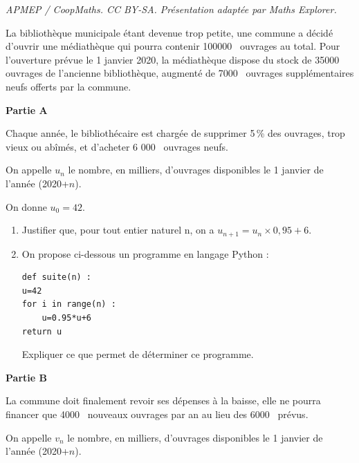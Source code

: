 \documentclass[10pt]{article}
\providecommand{\np}[2][]{{#2~#1}}
\begin{document}
\noindent\textit{APMEP / CoopMaths. CC BY-SA. Présentation adaptée par Maths Explorer.}\par\medskip
\medskip

La bibliothèque municipale étant devenue trop petite, une commune a décidé d'ouvrir une médiathèque qui pourra contenir \np{100000} ouvrages au total. Pour l'ouverture prévue le 1 janvier 2020, la médiathèque dispose du stock de \np{35000} ouvrages de l'ancienne bibliothèque, augmenté de \np{7000} ouvrages supplémentaires neufs offerts par la commune.

\medskip

\textbf{Partie A}

\medskip

Chaque année, le bibliothécaire est chargée de supprimer 5\,\% des ouvrages, trop vieux ou abîmés, et d'acheter \np{6 000} ouvrages neufs.

On appelle $u_n$ le nombre, en milliers, d'ouvrages disponibles le 1 janvier de l'année (2020+$n$).

On donne $u_0 = 42$.

\medskip
 
\begin{enumerate}
\item  Justifier que, pour tout entier naturel n, on a $u_{n+1} = u_n\times  0,95+6$.
\item On propose ci-dessous un programme en langage Python :
\begin{lstlisting}[style=python]
def suite(n) :
u=42
for i in range(n) :
	u=0.95*u+6
return u
\end{lstlisting}

Expliquer ce que permet de déterminer ce programme.
\end{enumerate}

\medskip

\textbf{Partie B}

\medskip

La commune doit finalement revoir ses dépenses à la baisse, elle ne pourra financer que \np{4000} nouveaux ouvrages par an au lieu des \np{6000} prévus.

On appelle $v_n$ le nombre, en milliers, d'ouvrages disponibles le 1 janvier de l'année (2020+$n$).

\medskip
\end{document}
